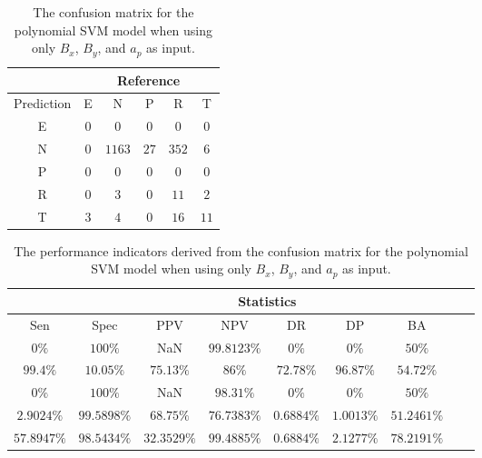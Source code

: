 \begin{table}[!ht]
	\centering
	\begin{tabular}{|c|c|c|c|c|c|}
		\hline
		 & \multicolumn{5}{|c|}{Reference} \\ \hline
		 Prediction & E & N & P & R & T \\ \hline
		 E & $0$ & $0$ & $0$ & $0$ & $0$ \\ \hline
		 N & $0$ & $1163$ & $27$ & $352$ & $6$ \\ \hline
		 P & $0$ & $0$ & $0$ & $0$ & $0$ \\ \hline
		 R & $0$ & $3$ & $0$ & $11$ & $2$ \\ \hline
		 T & $3$ & $4$ & $0$ & $16$ & $11$ \\ \hline
	\end{tabular}
	\caption{The confusion matrix for the polynomial SVM model when using only $B_{x}$, $B_{y}$, and $a_{p}$ as input.}
	\label{tab:cm:xyap:svmPoly}
\end{table}

\begin{table}[!ht]
	\centering
	\begin{tabular}{|c|c|c|c|c|c|c|c|c|}
		\hline
		 & \multicolumn{7}{c|}{Statistics} \\ \hline
		Sen & Spec & PPV & NPV & DR & DP & BA \\ \hline
		$0\%$ & $100\%$ & NaN & $99.8123\%$ & $0\%$ & $0\%$ & $50\%$ \\ \hline
		$99.4\%$ & $10.05\%$ & $75.13\%$ & $86\%$ & $72.78\%$ & $96.87\%$ & $54.72\%$ \\ \hline
		$0\%$ & $100\%$ & NaN & $98.31\%$ & $0\%$ & $0\%$ & $50\%$ \\ \hline
		$2.9024\%$ & $99.5898\%$ & $68.75\%$ & $76.7383\%$ & $0.6884\%$ & $1.0013\%$ & $51.2461\%$ \\ \hline
		$57.8947\%$ & $98.5434\%$ & $32.3529\%$ & $99.4885\%$ & $0.6884\%$ & $2.1277\%$ & $78.2191\%$ \\ \hline
	\end{tabular}
	\caption{The performance indicators derived from the confusion matrix for the polynomial SVM model when using only $B_{x}$, $B_{y}$, and $a_{p}$ as input.}
	\label{tab:cs:xyap:svmPoly}
\end{table}


